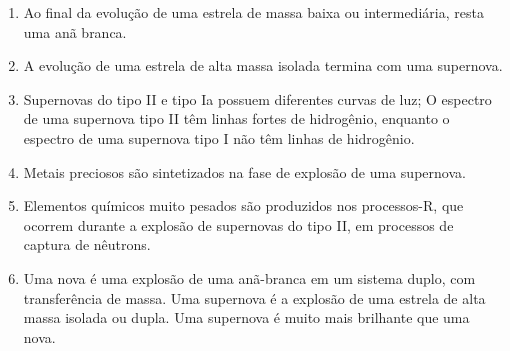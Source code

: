 \documentclass{article}
\begin{document}
\begin{enumerate}
  \item Ao final da evolução de uma estrela de massa baixa ou intermediária, resta uma anã branca.
  \item A evolução de uma estrela de alta massa isolada termina com uma supernova.
  \item Supernovas do tipo II e tipo Ia possuem diferentes curvas de luz; O espectro de uma supernova tipo II têm linhas fortes de hidrogênio, enquanto o espectro de uma supernova tipo I não têm linhas de hidrogênio.
  \item Metais preciosos são sintetizados na fase de explosão de uma supernova.
  \item Elementos químicos muito pesados são produzidos nos processos-R, que ocorrem durante a explosão de supernovas do tipo II, em processos de captura de nêutrons.
  \item Uma nova é uma explosão de uma anã-branca em um sistema duplo, com transferência de massa. Uma supernova é a explosão de uma estrela de alta massa isolada ou dupla. Uma supernova é muito mais brilhante que uma nova.
\end{enumerate}
\end{document}
